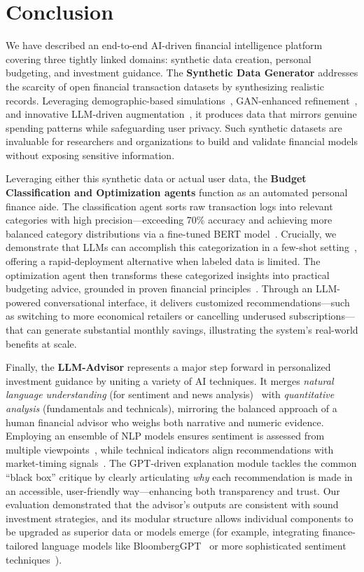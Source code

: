 \documentclass[conference]{IEEEtran}
\begin{document}
\section{Conclusion}

We have described an end-to-end AI-driven financial intelligence platform covering three tightly linked domains: synthetic data creation, personal budgeting, and investment guidance. The \textbf{Synthetic Data Generator} addresses the scarcity of open financial transaction datasets by synthesizing realistic records. Leveraging demographic-based simulations~\cite{acsdata}, GAN-enhanced refinement~\cite{ctgan2019}, and innovative LLM-driven augmentation~\cite{brown2020}, it produces data that mirrors genuine spending patterns while safeguarding user privacy. Such synthetic datasets are invaluable for researchers and organizations to build and validate financial models without exposing sensitive information.

Leveraging either this synthetic data or actual user data, the \textbf{Budget Classification and Optimization agents} function as an automated personal finance aide. The classification agent sorts raw transaction logs into relevant categories with high precision—exceeding 70\% accuracy and achieving more balanced category distributions via a fine-tuned BERT model~\cite{b6}. Crucially, we demonstrate that LLMs can accomplish this categorization in a few-shot setting~\cite{brown2020}, offering a rapid-deployment alternative when labeled data is limited. The optimization agent then transforms these categorized insights into practical budgeting advice, grounded in proven financial principles~\cite{b8}. Through an LLM-powered conversational interface, it delivers customized recommendations—such as switching to more economical retailers or cancelling underused subscriptions—that can generate substantial monthly savings, illustrating the system’s real-world benefits at scale.

Finally, the \textbf{LLM-Advisor} represents a major step forward in personalized investment guidance by uniting a variety of AI techniques. It merges \emph{natural language understanding} (for sentiment and news analysis)~\cite{b3,finbert2020} with \emph{quantitative analysis} (fundamentals and technicals), mirroring the balanced approach of a human financial advisor who weighs both narrative and numeric evidence. Employing an ensemble of NLP models ensures sentiment is assessed from multiple viewpoints~\cite{b3,b4,b5}, while technical indicators align recommendations with market-timing signals~\cite{hossain2019}. The GPT-driven explanation module tackles the common “black box” critique by clearly articulating \emph{why} each recommendation is made in an accessible, user-friendly way—enhancing both transparency and trust. Our evaluation demonstrated that the advisor’s outputs are consistent with sound investment strategies, and its modular structure allows individual components to be upgraded as superior data or models emerge (for example, integrating finance-tailored language models like BloombergGPT~\cite{b7} or more sophisticated sentiment techniques~\cite{fieberg2023}).
\end{document}
